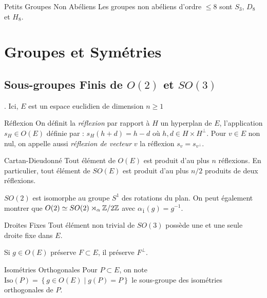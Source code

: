 \documentclass{cours}
\begin{document}
\begin{propositionfr}{Petits Groupes Non Abéliens}{}
    Les groupes non abéliens d'ordre $\leq 8$ sont $S_{3}$, $D_{8}$ et $H_{8}$.
\end{propositionfr}

\newpage
\section{Groupes et Symétries}
\subsection{Sous-groupes Finis de $O(2)$ et $SO(3)$}.
Ici, $E$ est un espace euclidien de dimension $n \geq 1$
\begin{définition}{Réflexion}{}
    On définit la \emph{réflexion} par rapport à $H$ un hyperplan de $E$, l'application $s_{H} \in O(E)$ définie par : $s_{H}(h + d) = h - d$ où $h, d \in H \times H^{\perp}$. Pour $v \in E$ non nul, on appelle aussi \emph{réflexion de vecteur } $v$ la réflexion $s_{v} = s_{v^{\perp}}$.
\end{définition}

\begin{théorème}{Cartan-Dieudonné}{}
    Tout élément de $O(E)$ est produit d'au plus $n$ réflexions. En particulier, tout élément de $SO(E)$ est produit d'au plus $n/2$ produits de deux réflexions.
\end{théorème}
\begin{remark}
    $SO(2)$ est isomorphe au groupe $S^{1}$ des rotations du plan. On peut également montrer que $O(2) \simeq SO(2) \rtimes_{\alpha} \mathbb{Z}/2\mathbb{Z}$ avec $\alpha_{\bar{1}}(g) = g^{-1}$.
\end{remark}

\begin{corollaire}{Droites Fixes}{}
    Tout élément non trivial de $SO(3)$ possède une et une seule droite fixe dans $E$.
\end{corollaire}

\begin{lemma}
    Si $g\in O(E)$ préserve $F \subset E$, il préserve $F^{\perp}$.
\end{lemma}

\begin{définition}{Isométries Orthogonales}{}
    Pour $P \subset E$, on note $\text{Iso}(P) = \left\{g \in O(E) \mid g(P) = P\right\}$ le sous-groupe des isométries orthogonales de $P$.
\end{définition}
\end{document}
